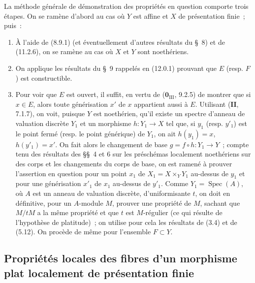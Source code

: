 \begin{env}[12.0.2]
\label{IV.12.0.2-fr}
La méthode générale de démonstration des propriétés en question comporte trois
étapes. On se ramène d'abord au cas où $Y$ est affine et $X$ de présentation
finie~; puis~:
\begin{enumerate}[label=\emph{\Alph*)}]
  \item À l'aide de (8.9.1) (et éventuellement d'autres résultats du \S~8) et
  de (11.2.6), on se ramène au cas où $X$ et $Y$ sont noethériens.
  \item On applique les résultats du \S~9 rappelés en (12.0.1) prouvant que
  $E$ (resp. $F$) est constructible.
  \item Pour voir que $E$ est ouvert, il suffit, en vertu de
  ($\mathbf 0_{\mathrm{III}}$, 9.2.5) de montrer que si $x\in E$, alors toute
  générisation $x'$ de $x$ appartient aussi à $E$. Utilisant ($\mathbf{II}$,
  7.1.7), on voit, puisque $Y$ est noethérien, qu'il existe un spectre d'anneau
  de valuation discrète $Y_1$ et un morphisme $h:Y_1\to X$ tel que, si $y_1$
  (resp. $y'_1$) est le point fermé (resp. le point générique) de $Y_1$, on ait
  $h(y_1)=x$, $h(y'_1)=x'$. On fait alors le changement de base
  $g=f\circ h:Y_1\to Y$~; compte tenu des résultats des \S\S~4 et 6 sur les
  préschémas localement noethériens sur des corps et les changements du corps
  de base, on est ramené à prouver l'assertion en question pour un point $x_1$
  de $X_1=X\times_YY_1$ au-dessus de $y_1$ et pour une générisation $x'_1$ de
  $x_1$ au-dessus de $y'_1$. Comme $Y_1=\operatorname{Spec}(A)$, où $A$ est
  un anneau de valuation discrète, d'uniformisante $t$, on doit en définitive,
  pour un $A$-module $M$, prouver une propriété de $M$, sachant que $M/tM$ a
  la même propriété et que $t$ est $M$-régulier (ce qui résulte de l'hypothèse
  de platitude)~; on utilise pour cela les résultats de (3.4) et de (5.12). On
  procède de même pour l'ensemble $F\subset Y$.
\end{enumerate}
\end{env}

\subsection{Propriétés locales des fibres d'un morphisme plat localement de
présentation finie}
\label{subsection:IV.12.1-fr}

